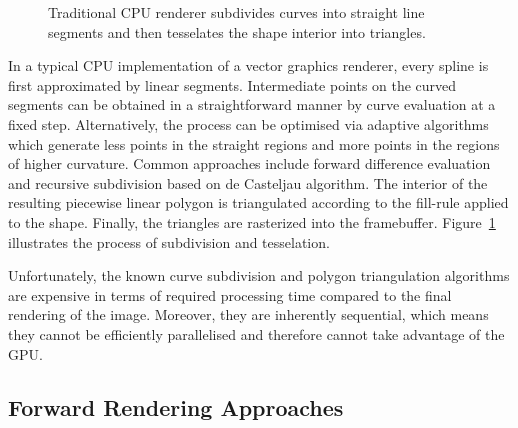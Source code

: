 \documentclass[11pt,a4paper,twoside]{article}
\begin{document}
\begin {figure} [ht]
	\centering
	\hspace{2.0cm}
	\caption {Traditional CPU renderer subdivides curves into straight line segments and then tesselates the shape interior into triangles.}
	\label {fig:cpu}
\end {figure}

In a typical CPU implementation of a vector graphics renderer, every spline is first approximated by linear segments. Intermediate points on the curved segments can be obtained in a straightforward manner by curve evaluation at a fixed step. Alternatively, the process can be optimised via adaptive algorithms which generate less points in the straight regions and more points in the regions of higher curvature. Common approaches include forward difference evaluation and recursive subdivision based on de Casteljau algorithm. The interior of the resulting piecewise linear polygon is triangulated according to the fill-rule applied to the shape. Finally, the triangles are rasterized into the framebuffer. Figure~\ref{fig:cpu} illustrates the process of subdivision and tesselation.

Unfortunately, the known curve subdivision and polygon triangulation algorithms are expensive in terms of required processing time compared to the final rendering of the image. Moreover, they are inherently sequential, which means they cannot be efficiently parallelised and therefore cannot take advantage of the GPU.

\subsection {Forward Rendering Approaches}
\end{document}
